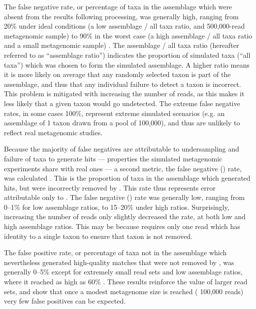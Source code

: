 

The false negative rate, or percentage of taxa in the assemblage which were absent from the  results following  processing, was generally high, ranging from \textapprox{} 20\% under ideal conditions (a low assemblage / all taxa ratio, and 500,000-read metagenomic sample) to \textapprox{} 90\% in the worst case (a high assemblage / all taxa ratio and a small metagenomic sample) .
The assemblage / all taxa ratio (hereafter referred to as ``assemblage ratio'') indicates the proportion of simulated taxa (``all taxa'') which was chosen to form the simulated assemblage.
A higher ratio means it is more likely on average that any randomly selected taxon is part of the assemblage, and thus that any individual failure to detect a taxon is incorrect.
This problem is mitigated with increasing the number of reads, as this makes it less likely that a given taxon would go undetected.
The extreme false negative rates, in some cases 100\%, represent extreme simulated scenarios (e.g. an assemblage of 1 taxon drawn from a pool of 100,000), and thus are unlikely to reflect real metagenomic studies.

Because the majority of false negatives are attributable to undersampling and failure of taxa to generate  hits --- properties the simulated metagenomic experiments share with real ones --- a second metric, the false negative () rate, was calculated .
This is the proportion of taxa in the assemblage which generated  hits, but were incorrectly removed by .
This rate thus represents error attributable only to .
The false negative () rate was generally low, ranging from \textapprox{} 0--1\% for low assemblage ratios, to \textapprox{} 15--20\% under high ratios.
Surprisingly, increasing the number of reads only slightly decreased the rate, at both low and high assemblage ratios.
This may be because  requires only one read which has identity to a single taxon to ensure that taxon is not removed.

The false positive rate, or percentage of taxa not in the assemblage which nevertheless generated high-quality  matches that were not removed by , was generally \textapprox{} 0--5\% except for extremely small read sets and low assemblage ratios, where it reached as high as 60\% .
These results reinforce the value of larger read sets, and show that once a modest metagenome size is reached (\textapprox{} 100,000 reads) very few false positives can be expected.

